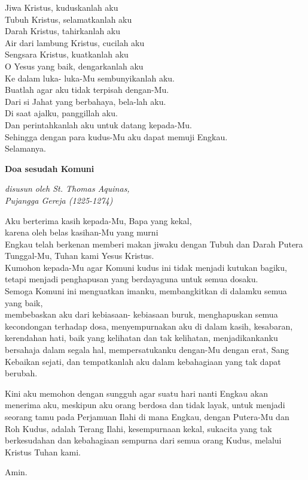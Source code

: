 \documentclass[a5paper,headsepline,titlepage,10pt,nnormalheadings,DIVcalc]{scrbook}
\makeatletter
\newcommand{\subjudul}[1]{%
  {\parindent \z@ 
    \interlinepenalty\@M \bfseries #1\par\nobreak \vskip 5\p@ }}
\newcommand{\keterangan}[1]{%
  {\parindent \z@  \slshape 
    \interlinepenalty\@M \vskip -7\p@ \scriptsize \textsl{#1}\par\nobreak  \vskip 5\p@}}
\makeatother
\begin{document}
Jiwa Kristus, kuduskanlah aku\\
Tubuh Kristus, selamatkanlah aku\\
Darah Kristus, tahirkanlah aku\\
Air dari lambung Kristus, cucilah aku\\

Sengsara Kristus, kuatkanlah aku\\
O Yesus yang baik, dengarkanlah aku\\
Ke dalam luka- luka-Mu sembunyikanlah aku.\\
Buatlah agar aku tidak terpisah dengan-Mu.\\
Dari si Jahat yang berbahaya, bela-lah aku.\\
Di saat ajalku, panggillah aku.\\
Dan perintahkanlah aku untuk datang kepada-Mu.\\
Sehingga dengan para kudus-Mu aku dapat memuji Engkau.\\
Selamanya.

\subjudul{Doa sesudah Komuni}
\keterangan{disusun oleh St. Thomas Aquinas, \\Pujangga Gereja (1225-1274)}

Aku berterima kasih kepada-Mu, Bapa yang kekal,\\
karena oleh belas kasihan-Mu yang murni\\
Engkau telah berkenan memberi makan jiwaku dengan Tubuh dan Darah Putera Tunggal-Mu, Tuhan kami Yesus Kristus.\\

Kumohon kepada-Mu agar Komuni kudus ini tidak menjadi kutukan bagiku,\\
tetapi menjadi penghapusan yang berdayaguna untuk semua dosaku.\\
Semoga Komuni ini menguatkan imanku, membangkitkan di dalamku semua yang baik,\\ membebaskan aku dari kebiasaan- kebiasaan buruk, menghapuskan semua kecondongan terhadap dosa, menyempurnakan aku di dalam kasih, kesabaran, kerendahan hati, baik yang kelihatan dan tak kelihatan, menjadikankanku bersahaja dalam segala hal, mempersatukanku dengan-Mu dengan erat, Sang Kebaikan sejati, dan tempatkanlah aku dalam kebahagiaan yang tak dapat berubah.

Kini aku memohon dengan sungguh agar suatu hari nanti Engkau akan menerima aku, meskipun aku orang berdosa dan tidak layak, untuk menjadi seorang tamu pada Perjamuan Ilahi di mana Engkau, dengan Putera-Mu dan Roh Kudus, adalah Terang Ilahi, kesempurnaan kekal, sukacita yang tak berkesudahan dan kebahagiaan sempurna dari semua orang Kudus, melalui Kristus Tuhan kami.

Amin.
\end{document}
